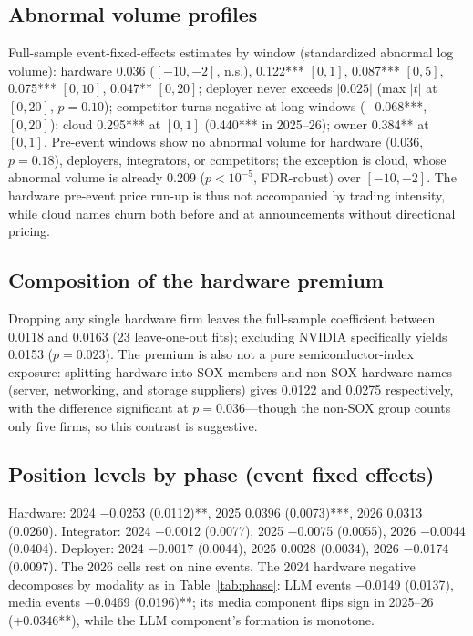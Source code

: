 \documentclass[review,12pt,authoryear]{elsarticle}
\begin{document}
\subsection{Abnormal volume profiles}
Full-sample event-fixed-effects estimates by window (standardized abnormal
log volume): hardware 0.036 ($[-10,-2]$, n.s.), 0.122*** $[0,1]$,
0.087*** $[0,5]$, 0.075*** $[0,10]$, 0.047** $[0,20]$; deployer never exceeds
$|0.025|$ (max $|t|$ at $[0,20]$, $p=0.10$); competitor turns negative at
long windows ($-$0.068***, $[0,20]$); cloud 0.295*** at $[0,1]$
(0.440*** in 2025--26); owner 0.384** at $[0,1]$. Pre-event windows show no
abnormal volume for hardware (0.036, $p=0.18$), deployers, integrators, or
competitors; the exception is cloud, whose abnormal volume is already 0.209
($p<10^{-5}$, FDR-robust) over $[-10,-2]$. The hardware pre-event
price run-up is thus not accompanied by trading intensity, while cloud
names churn both before and at announcements without directional pricing.

\subsection{Composition of the hardware premium}
Dropping any single hardware firm leaves the full-sample coefficient between
0.0118 and 0.0163 (23 leave-one-out fits); excluding NVIDIA specifically
yields 0.0153 ($p=0.023$). The premium is also not a pure semiconductor-index
exposure: splitting hardware into SOX members and non-SOX hardware names
(server, networking, and storage suppliers) gives 0.0122 and 0.0275
respectively, with the difference significant at $p=0.036$---though the
non-SOX group counts only five firms, so this contrast is suggestive.

\subsection{Position levels by phase (event fixed effects)}
Hardware: 2024 $-$0.0253 (0.0112)**, 2025 0.0396 (0.0073)***, 2026 0.0313
(0.0260). Integrator: 2024 $-$0.0012 (0.0077), 2025 $-$0.0075 (0.0055),
2026 $-$0.0044 (0.0404). Deployer: 2024 $-$0.0017 (0.0044), 2025 0.0028
(0.0034), 2026 $-$0.0174 (0.0097). The 2026 cells rest on nine events. The
2024 hardware negative decomposes by modality as in
Table~\ref{tab:phase}: LLM events $-$0.0149 (0.0137), media events
$-$0.0469 (0.0196)**; its media component flips sign in 2025--26 (+0.0346**),
while the LLM component's formation is monotone.
\end{document}
